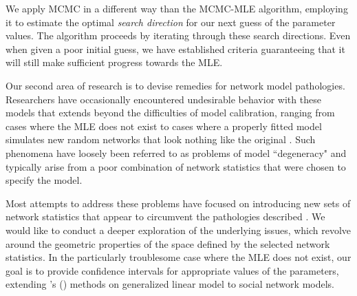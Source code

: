 \documentclass[12pt]{article}
\begin{document}
We apply MCMC in a different way than the MCMC-MLE algorithm, employing it to estimate the optimal \textit{search direction} for our next guess of the parameter values.  The algorithm proceeds by iterating through these search directions.  Even when given a poor initial guess, we have established criteria guaranteeing that it will still make sufficient progress towards the MLE.  


Our second area of research is to devise remedies for network model pathologies.
Researchers have occasionally encountered undesirable behavior with these models that extends beyond the difficulties of model calibration, ranging from cases where the MLE does not exist to cases where a properly fitted model simulates new random networks that look nothing like the original \citep{Rinaldo:2009}.  Such phenomena have loosely been referred to as problems of model ``degeneracy" and typically arise from a poor combination of network statistics that were chosen to specify the model.

Most attempts to address these problems have focused on introducing new sets of network statistics that appear to circumvent the pathologies described \citep{Hunter:2006, Morris:2008}.  We would like to conduct a deeper exploration of the underlying issues, which revolve around the geometric properties of the space defined by the selected network statistics.  In the particularly troublesome case where the MLE does not exist, our goal is to provide confidence intervals for appropriate values of the parameters, extending \citeauthor{Geyer:gdor}'s (\citeyear{Geyer:gdor}) methods on generalized linear model to social network models. 

\end{document}
